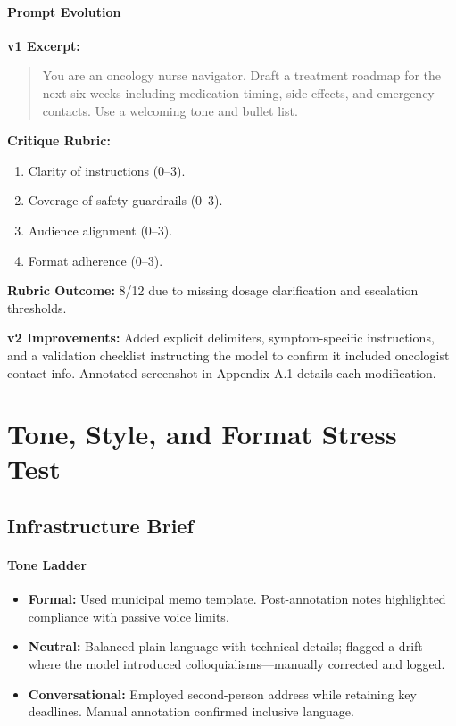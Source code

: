 \documentclass[11pt]{article}
\begin{document}
\paragraph{Prompt Evolution}
\textbf{v1 Excerpt:}
\begin{quote}
You are an oncology nurse navigator. Draft a treatment roadmap for the next six weeks including medication timing, side effects, and emergency contacts. Use a welcoming tone and bullet list.
\end{quote}

\textbf{Critique Rubric:}
\begin{enumerate}[label*=\arabic*.]
    \item Clarity of instructions (0--3).
    \item Coverage of safety guardrails (0--3).
    \item Audience alignment (0--3).
    \item Format adherence (0--3).
\end{enumerate}

\textbf{Rubric Outcome:} 8/12 due to missing dosage clarification and escalation thresholds.

\textbf{v2 Improvements:} Added explicit delimiters, symptom-specific instructions, and a validation checklist instructing the model to confirm it included oncologist contact info. Annotated screenshot in Appendix A.1 details each modification.

\section{Tone, Style, and Format Stress Test}
\subsection{Infrastructure Brief}
\paragraph{Tone Ladder}
\begin{itemize}[leftmargin=*]
    \item \textbf{Formal:} Used municipal memo template. Post-annotation notes highlighted compliance with passive voice limits.
    \item \textbf{Neutral:} Balanced plain language with technical details; flagged a drift where the model introduced colloquialisms---manually corrected and logged.
    \item \textbf{Conversational:} Employed second-person address while retaining key deadlines. Manual annotation confirmed inclusive language.
\end{itemize}
\end{document}
